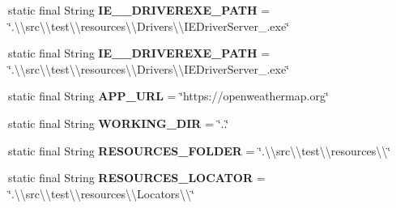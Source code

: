 \begin{DoxyCompactItemize}
\item 
\mbox{\label{classmain_1_1util_1_1_framework_constants_a806a1e26fc762fef157bb3028212603b}} 
static final String {\bfseries I\+E\+\_\+\_\+\+D\+R\+I\+V\+E\+R\+E\+X\+E\+\_\+\+P\+A\+TH} = \char`\"{}.\textbackslash{}\textbackslash{}src\textbackslash{}\textbackslash{}test\textbackslash{}\textbackslash{}resources\textbackslash{}\textbackslash{}\+Drivers\textbackslash{}\textbackslash{}\+I\+E\+Driver\+Server\+\_.\+exe\char`\"{}
\item 
\mbox{\label{classmain_1_1util_1_1_framework_constants_aa8f9c7c60030a03a6c4c992be414f2a5}} 
static final String {\bfseries I\+E\+\_\+\_\+\+D\+R\+I\+V\+E\+R\+E\+X\+E\+\_\+\+P\+A\+TH} = \char`\"{}.\textbackslash{}\textbackslash{}src\textbackslash{}\textbackslash{}test\textbackslash{}\textbackslash{}resources\textbackslash{}\textbackslash{}\+Drivers\textbackslash{}\textbackslash{}\+I\+E\+Driver\+Server\+\_.\+exe\char`\"{}
\item 
\mbox{\label{classmain_1_1util_1_1_framework_constants_a7069c6bc1634ca068b167fc62717640b}} 
static final String {\bfseries A\+P\+P\+\_\+\+U\+RL} = \char`\"{}https\+://openweathermap.\+org\char`\"{}
\item 
\mbox{\label{classmain_1_1util_1_1_framework_constants_a77eb73cf58cc42747c7ea34d2489242c}} 
static final String {\bfseries W\+O\+R\+K\+I\+N\+G\+\_\+\+D\+IR} = \char`\"{}..\char`\"{}
\item 
\mbox{\label{classmain_1_1util_1_1_framework_constants_a500fed0f1ec588999c097ffee7390868}} 
static final String {\bfseries R\+E\+S\+O\+U\+R\+C\+E\+S\+\_\+\+F\+O\+L\+D\+ER} = \char`\"{}.\textbackslash{}\textbackslash{}src\textbackslash{}\textbackslash{}test\textbackslash{}\textbackslash{}resources\textbackslash{}\textbackslash{}\char`\"{}
\item 
\mbox{\label{classmain_1_1util_1_1_framework_constants_ab50a2ad5c33ae063332c66d934e3c5be}} 
static final String {\bfseries R\+E\+S\+O\+U\+R\+C\+E\+S\+\_\+\+L\+O\+C\+A\+T\+OR} = \char`\"{}.\textbackslash{}\textbackslash{}src\textbackslash{}\textbackslash{}test\textbackslash{}\textbackslash{}resources\textbackslash{}\textbackslash{}\+Locators\textbackslash{}\textbackslash{}\char`\"{}

\end{DoxyCompactItemize}
